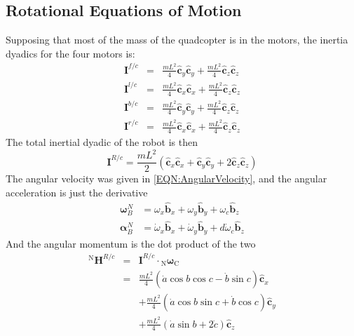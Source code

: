 \documentclass[lettersize,journal]{IEEEtran}
\begin{document}
\subsection{Rotational Equations of Motion}
Supposing that most of the mass of the quadcopter is in the motors, the inertia dyadics for the four motors is:
\begin{eqnarray}
  \mathbf{I}^{f/c} &=& \frac{mL^2}{4} \mathbf{\hat{c}}_y\mathbf{\hat{c}}_y + \frac{mL^2}{4} \mathbf{\hat{c}}_z \mathbf{\hat{c}}_z \\
  \mathbf{I}^{l/c} &=& \frac{mL^2}{4} \mathbf{\hat{c}}_x\mathbf{\hat{c}}_x + \frac{mL^2}{4} \mathbf{\hat{c}}_z \mathbf{\hat{c}}_z \\
  \mathbf{I}^{b/c} &=& \frac{mL^2}{4} \mathbf{\hat{c}}_y\mathbf{\hat{c}}_y + \frac{mL^2}{4} \mathbf{\hat{c}}_z \mathbf{\hat{c}}_z \\
  \mathbf{I}^{r/c} &=& \frac{mL^2}{4} \mathbf{\hat{c}}_x\mathbf{\hat{c}}_x + \frac{mL^2}{4} \mathbf{\hat{c}}_z \mathbf{\hat{c}}_z
\end{eqnarray}
The total inertial dyadic of the robot is then
\begin{equation}
  \mathbf{I}^{R/c} = \frac{mL^2}{2} \left(\mathbf{\hat{c}}_x\mathbf{\hat{c}}_x + \mathbf{\hat{c}}_y\mathbf{\hat{c}}_y + 2 \mathbf{\hat{c}}_z\mathbf{\hat{c}}_z\right)
\end{equation}
The angular velocity was given in \ref{EQN:AngularVelocity}, and the angular acceleration is just the derivative
\begin{align}
  {\boldsymbol\omega^N_B} &= \omega_x\mathbf{\hat{b}}_x + \omega_y\mathbf{\hat{b}}_y + \omega_c \mathbf{\hat{b}}_z \nonumber \\
	{\boldsymbol\alpha^N_B} &= \dot\omega_x\mathbf{\hat{b}}_x + \dot\omega_y\mathbf{\hat{b}}_y + d\dot\omega_c \mathbf{\hat{b}}_z
\end{align}
And the angular momentum is the dot product of the two
\begin{eqnarray}
  {^\mathrm{N}\mathbf{H}^{R/c}} &=& \mathbf{I}^{R/c} \cdot {_\mathrm{N}\boldsymbol\omega_\mathrm{C}}\nonumber\\
  &=&\frac{mL^2}{4}\left(\dot{a} \cos b \cos c - \dot{b} \sin c\right) \mathbf{\hat{c}}_x\nonumber\\
  &&+\frac{mL^2}{4}\left(\dot{a} \cos b \sin c + \dot{b} \cos c\right) \mathbf{\hat{c}}_y\nonumber\\
  &&+\frac{mL^2}{4}\left(\dot{a}\sin b + 2\dot{c}\right) \mathbf{\hat{c}}_z
\end{eqnarray}
\end{document}
